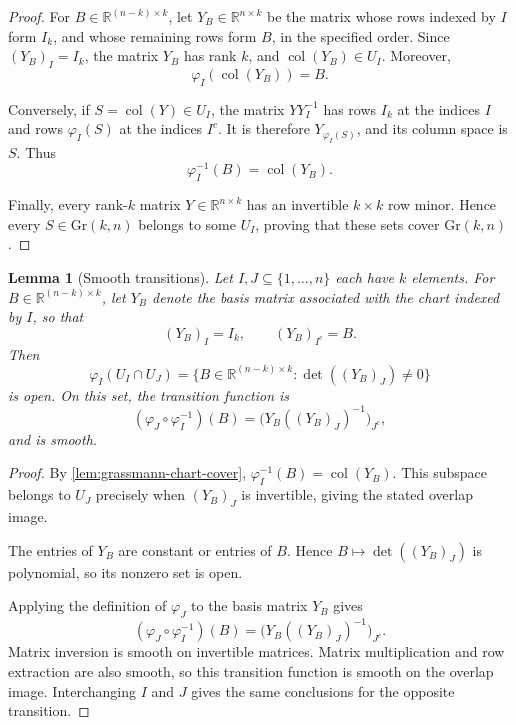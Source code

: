 \documentclass[12pt]{article}
\theoremstyle{definition}
\theoremstyle{plain}
\newtheorem{lemma}[definition]{Lemma}
\theoremstyle{remark}
\newcommand{\R}{\mathbb{R}}
\newcommand{\Gr}{\mathrm{Gr} (k,n)}
\DeclareMathOperator{\col}{col}              %
\begin{document}
\begin{proof}
  For \( B \in \R^{(n-k)\times k} \), let \( Y_B \in \R^{n\times k} \) be the matrix whose rows indexed by \( I \) form \( I_k \), and whose remaining rows form \( B \), in the specified order.
  Since \( (Y_B)_I=I_k \), the matrix \( Y_B \) has rank \( k \), and \( \col(Y_B) \in U_I \).
  Moreover,
  \[
    \varphi_I(\col(Y_B))=B.
  \]

  Conversely, if \( S=\col(Y) \in U_I \), the matrix \( YY_I^{-1} \) has rows \( I_k \) at the indices \( I \) and rows \( \varphi_I(S) \) at the indices \( I^c \).
  It is therefore \( Y_{\varphi_I(S)} \), and its column space is \( S \).
  Thus
  \[
    \varphi_I^{-1}(B)=\col(Y_B).
  \]

  Finally, every rank-\( k \) matrix \( Y \in \R^{n\times k} \) has an invertible \( k\times k \) row minor.
  Hence every \( S \in \Gr \) belongs to some \( U_I \), proving that these sets cover \( \Gr \).
\end{proof}

\begin{lemma}[Smooth transitions]\label{lem:grassmann-transitions}
  Let \( I,J \subseteq \{1,\dots,n\} \) each have \( k \) elements.
  For \( B \in \R^{(n-k)\times k} \), let \( Y_B \) denote the basis matrix associated with the chart indexed by \( I \), so that
  \[
    (Y_B)_I = I_k, \qquad (Y_B)_{I^c} = B.
  \]
  Then
  \[
    \varphi_I(U_I \cap U_J) = \{B \in \R^{(n-k)\times k} : \det((Y_B)_J) \ne 0\}
  \]
  is open.
  On this set, the transition function is
  \[
    (\varphi_J \circ \varphi_I^{-1})(B) = \bigl(Y_B((Y_B)_J)^{-1}\bigr)_{J^c},
  \]
  and is smooth.
\end{lemma}

\begin{proof}
  By \cref{lem:grassmann-chart-cover}, \( \varphi_I^{-1}(B)=\col(Y_B) \).
  This subspace belongs to \( U_J \) precisely when \( (Y_B)_J \) is invertible, giving the stated overlap image.

  The entries of \( Y_B \) are constant or entries of \( B \).
  Hence \( B \mapsto \det((Y_B)_J) \) is polynomial, so its nonzero set is open.

  Applying the definition of \( \varphi_J \) to the basis matrix \( Y_B \) gives
  \[
    (\varphi_J \circ \varphi_I^{-1})(B) = \bigl(Y_B((Y_B)_J)^{-1}\bigr)_{J^c}.
  \]
  Matrix inversion is smooth on invertible matrices.
  Matrix multiplication and row extraction are also smooth, so this transition function is smooth on the overlap image.
  Interchanging \( I \) and \( J \) gives the same conclusions for the opposite transition.
\end{proof}
\end{document}
